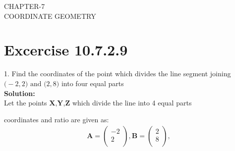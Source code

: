 \documentclass[12pt]{article}
\newcommand{\solution}{\noindent \textbf{Solution: }}
\newcommand{\myvec}[1]{\ensuremath{\begin{pmatrix}#1\end{pmatrix}}}
\let\vec\mathbf
\begin{document}
\begin{center}
\textbf\large{CHAPTER-7 \\ COORDINATE GEOMETRY}
\end{center}
\section*{Excercise 10.7.2.9}

1. Find the coordinates of the point which divides the line segment joining $\vec(-2,2) \text{ and } \vec(2,8)$ into four equal parts
\\
\solution\\		
Let the points $\vec{X}$,$\vec{Y}$,$\vec{Z}$ which divide the line into 4 equal parts\\

\begin{table}[ht!]\centering

\end{table}

coordinates and ratio are given as:
\begin{align}
\vec{A}=\myvec{-2\\2\\},
\vec{B}=\myvec{2\\8\\},
\end{align}
\end{document}
